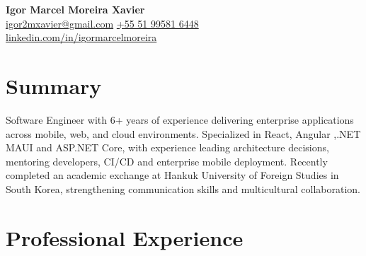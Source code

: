 \documentclass[a4paper,10pt]{article}
\begin{document}
\begin{center}
    {\LARGE \textbf{Igor Marcel Moreira Xavier}} \\
    \vspace{2mm}
    \href{mailto:igor2mxavier@gmail.com}{igor2mxavier@gmail.com} \quad
    \href{tel:+5551995816448}{+55 51 99581 6448} \\
    \href{https://linkedin.com/in/igormarcelmoreira}{linkedin.com/in/igormarcelmoreira}
\end{center}

\vspace{4mm}

\section*{Summary}

Software Engineer with 6+ years of experience delivering enterprise applications across mobile, web, and cloud environments. Specialized in  React, Angular ,.NET MAUI and ASP.NET Core, with experience leading architecture decisions, mentoring developers, CI/CD and enterprise mobile deployment. Recently completed an academic exchange at Hankuk University of Foreign Studies in South Korea, strengthening communication skills and multicultural collaboration.

\section*{Professional Experience}
\end{document}
